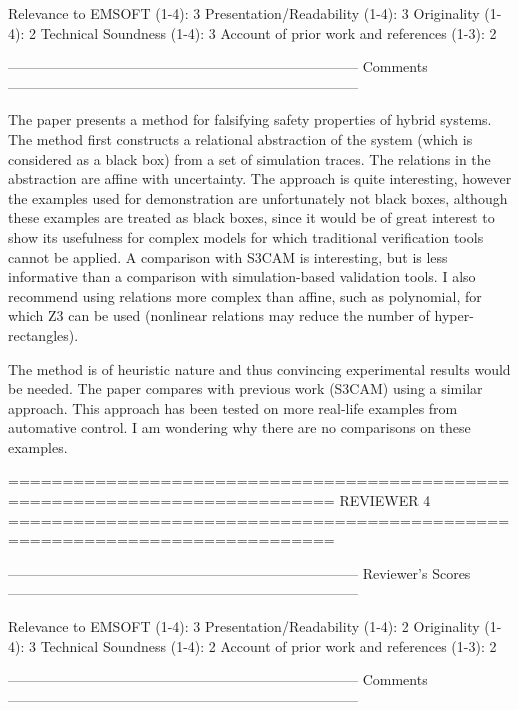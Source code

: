                Relevance to EMSOFT (1-4): 3
          Presentation/Readability (1-4): 3
                       Originality (1-4): 2
               Technical Soundness (1-4): 3
Account of prior work and references (1-3): 2


---------------------------------------------------------------------------
Comments
---------------------------------------------------------------------------

The paper presents a method for falsifying safety properties of hybrid systems.
The method first constructs a relational abstraction of the system (which is
considered as a black box) from a set of simulation traces. The relations in
the abstraction are affine with uncertainty. The approach is quite interesting,
however the examples used for demonstration are unfortunately not black boxes,
although these examples are treated as black boxes, since it would be of great
interest to show its usefulness for complex models for which traditional
verification tools cannot be applied. A comparison with S3CAM is interesting,
but is less informative than a comparison with simulation-based validation
tools.
I also recommend using relations more complex than affine, such as polynomial,
for which Z3 can be used (nonlinear relations may reduce the number of
hyper-rectangles).

The method is of heuristic nature and thus convincing experimental results
would be needed. The paper compares with previous work (S3CAM) using a similar
approach. This approach has been tested on more real-life examples from
automative control. I am wondering why there are no comparisons on these
examples.

============================================================================
                            REVIEWER 4
============================================================================


---------------------------------------------------------------------------
Reviewer's Scores
---------------------------------------------------------------------------

               Relevance to EMSOFT (1-4): 3
          Presentation/Readability (1-4): 2
                       Originality (1-4): 3
               Technical Soundness (1-4): 2
Account of prior work and references (1-3): 2


---------------------------------------------------------------------------
Comments
---------------------------------------------------------------------------

